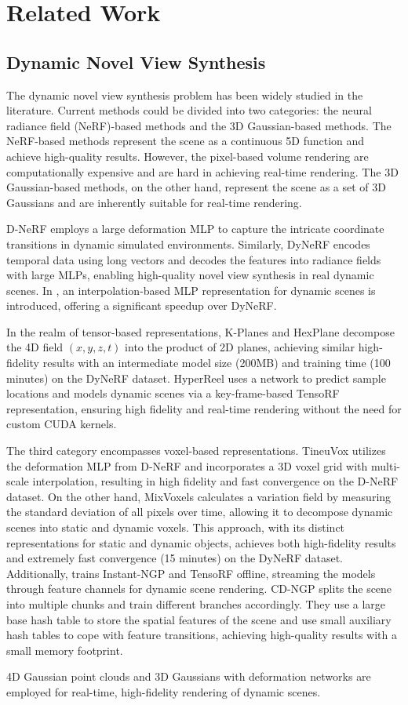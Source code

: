 \section{Related Work}
\subsection{Dynamic Novel View Synthesis}

The dynamic novel view synthesis problem has been widely studied in the literature. Current methods could be divided into two categories: the neural radiance field (NeRF)-based methods and the 3D Gaussian-based methods. The NeRF-based methods represent the scene as a continuous 5D function and achieve high-quality results. However, the pixel-based volume rendering are computationally expensive and are hard in achieving real-time rendering. 
The 3D Gaussian-based methods, on the other hand, represent the scene as a set of 3D Gaussians and are inherently suitable for real-time rendering. 

D-NeRF \cite{Dnerf} employs a large deformation MLP to capture the intricate coordinate transitions in dynamic simulated environments. Similarly, DyNeRF \cite{Dynerf} encodes temporal data using long vectors and decodes the features into radiance fields with large MLPs, enabling high-quality novel view synthesis in real dynamic scenes. In \cite{park2023temporal}, an interpolation-based MLP representation for dynamic scenes is introduced, offering a significant speedup over DyNeRF. 

In the realm of tensor-based representations,  K-Planes \cite{kplanes} and HexPlane \cite{HexPlane_} decompose the 4D field $(x,y,z,t)$ into the product of 2D planes, achieving similar high-fidelity results with an intermediate model size (200MB) and training time (100 minutes) on the DyNeRF dataset.  HyperReel \cite{hyperreel} uses a network to predict sample locations and models dynamic scenes via a key-frame-based TensoRF \cite{tensorf} representation, ensuring high fidelity and real-time rendering without the need for custom CUDA kernels. 


The third category encompasses  voxel-based representations. TineuVox \cite{tineuvox} utilizes the deformation MLP from D-NeRF and incorporates a 3D voxel grid with multi-scale interpolation, resulting in high fidelity and fast convergence on the D-NeRF dataset. On the other hand, MixVoxels \cite{mixvoxels} calculates a variation field by measuring the standard deviation of all pixels over time, allowing it to decompose dynamic scenes into static and dynamic voxels. This approach, with its distinct representations for static and dynamic objects, achieves both high-fidelity results and extremely fast convergence (15 minutes) on the DyNeRF dataset. Additionally, \cite{nerfplayer} trains Instant-NGP \cite{ingp} and TensoRF \cite{tensorf} offline, streaming the models through feature channels for dynamic scene rendering. CD-NGP \cite{cdngp} splits the scene into multiple chunks and train different branches accordingly. They use a large base hash table to store the spatial features of the scene and use small auxiliary hash tables to cope with feature transitions, achieving high-quality results with a small memory footprint. 


4D Gaussian point clouds \cite{4Dgaussians,gs4dhust} and 3D Gaussians with deformation networks \cite{deformable3Dgaussians} are employed for real-time, high-fidelity rendering of dynamic scenes.